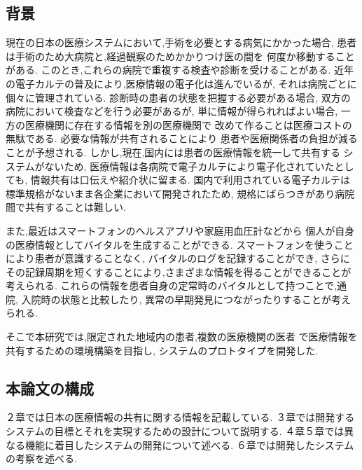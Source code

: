 \subsection{背景}
  現在の日本の医療システムにおいて,手術を必要とする病気にかかった場合,
  患者は手術のため大病院と,経過観察のためかかりつけ医の間を
  何度か移動することがある.
  このとき,これらの病院で重複する検査や診断を受けることがある.
  近年の電子カルテの普及により,医療情報の電子化は進んでいるが,
  それは病院ごとに個々に管理されている.
  診断時の患者の状態を把握する必要がある場合,
  双方の病院において検査などを行う必要があるが,
  単に情報が得られればよい場合,
  一方の医療機関に存在する情報を別の医療機関で
  改めて作ることは医療コストの無駄である.
  必要な情報が共有されることにより
  患者や医療関係者の負担が減ることが予想される.
  しかし,現在,国内には患者の医療情報を統一して共有する
  システムがないため,
  医療情報は各病院で電子カルテにより電子化されていたとしても,
  情報共有は口伝えや紹介状に留まる.
  国内で利用されている電子カルテは標準規格がないまま各企業において開発されたため,
  規格にばらつきがあり病院間で共有することは難しい.\cite{bibi2}

  また,最近はスマートフォンのヘルスアプリや家庭用血圧計などから
  個人が自身の医療情報としてバイタルを生成することができる.
  スマートフォンを使うことにより患者が意識することなく,
  バイタルのログを記録することができ,
  さらにその記録周期を短くすることにより,さまざまな情報を得ることができることが考えられる.
  これらの情報を患者自身の定常時のバイタルとして持つことで,通院,
  入院時の状態と比較したり,
  異常の早期発見につながったりすることが考えられる.

  そこで本研究では,限定された地域内の患者,複数の医療機関の医者
  で医療情報を共有するための環境構築を目指し,
  システムのプロトタイプを開発した.

\subsection{本論文の構成}
  ２章では日本の医療情報の共有に関する情報を記載している.
  ３章では開発するシステムの目標とそれを実現するための設計について説明する.
  ４章５章では異なる機能に着目したシステムの開発について述べる.
  ６章では開発したシステムの考察を述べる.
